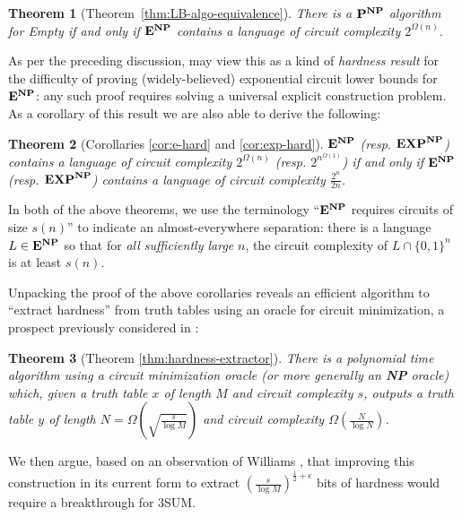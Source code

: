 \documentclass[11pt]{article}
\newtheorem*{theorem*}{Theorem}
\newcommand{\varbound}{\frac{2^n}{2n}}
\def\cl{\bf}
\begin{document}
\begin{theorem*}[Theorem~\ref{thm:LB-algo-equivalence}]
There is a ${\cl P}^{\cl NP}$ algorithm for {\sc Empty} if and only if ${\cl E}^{\cl NP}$ contains a language of circuit complexity $2^{\Omega(n)}$.
\end{theorem*}
As per the preceding discussion, may view this as a kind of \emph{hardness result} for the difficulty of proving (widely-believed) exponential circuit lower bounds for ${\cl E}^{\cl NP}$: any such proof requires solving a universal explicit construction problem. As a corollary of this result we are also able to derive the following:
\begin{theorem*}[Corollaries \ref{cor:e-hard} and \ref{cor:exp-hard}]
${\cl E}^{\cl NP}$ (resp. ${\cl EXP}^{\cl NP}$)  contains a language of circuit complexity $2^{\Omega(n)}$ (resp. $2^{n^{\Omega(1)}}$) \emph{if and only if} ${\cl E}^{\cl NP}$ (resp. ${\cl EXP}^{\cl NP}$) contains a language of circuit complexity $\varbound$.
\end{theorem*}

In both of the above theorems, we use the terminology ``${\cl E^{NP}}$ requires circuits of size $s(n)$'' to indicate an almost-everywhere separation: there is a language $L \in {\cl E^{NP}}$ so that for \emph{all sufficiently large} $n$, the circuit complexity of $L \cap \{0,1\}^n$ is at least $s(n)$.

Unpacking the proof of the above corollaries reveals an efficient algorithm to ``extract hardness'' from truth tables using an oracle for circuit minimization, a prospect previously considered in \cite{hardness-harder}:

\begin{theorem*}[Theorem \ref{thm:hardness-extractor}]
There is a polynomial time algorithm using a circuit minimization oracle (or more generally an {\cl NP} oracle) which, given a truth table $x$ of length $M$ and circuit complexity $s$, outputs a truth table $y$ of length $N = {\Omega}(\sqrt{\frac{s}{\log M}})$ and circuit complexity $\Omega(\frac{N}{\log N})$.
\end{theorem*}

We then argue, based on an observation of Williams \cite{sat-lb}, that improving this construction in its current form to extract $(\frac{s}{\log M})^{\frac{1}{2} + \epsilon}$ bits of hardness would require a breakthrough for {\sc 3SUM}.
\end{document}

